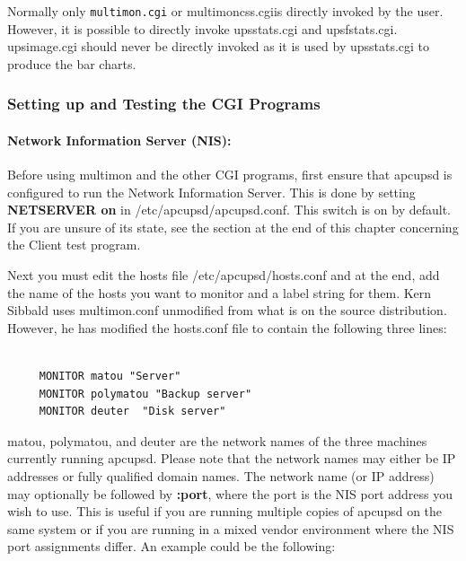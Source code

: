 {{{{{{{Normally only {\tt multimon.cgi} or multimoncss.cgiis directly invoked by the
user. However, it is possible to directly invoke upsstats.cgi and
upsfstats.cgi. upsimage.cgi should never be directly invoked as it is used by
upsstats.cgi to produce the bar charts. 

\label{Setting-up-and-Testing-the-CGI-Programs}

\subsubsection*{Setting up and Testing the CGI Programs}

\label{index-Setup-CGI-programs-122}
\label{index-Testing-CGI-programs-123}

\label{Network-Information-Server-_005bNIS_005d}

\paragraph*{Network Information Server (NIS):}

\label{index-Network-Information-Server-124}
\label{index-NIS-125}
Before using multimon and the other CGI programs, first ensure that apcupsd is
configured to run the Network Information Server. This is done by setting {\bf
NETSERVER on} in /etc/apcupsd/apcupsd.conf.  This switch is on by default.  If
you are unsure of its state, see the section at the end of this chapter
concerning the Client test program.  

Next you must edit the hosts file /etc/apcupsd/hosts.conf and at the end, add
the name of the hosts you want to monitor and a label string for them. Kern
Sibbald uses multimon.conf unmodified from what is on the source distribution.
However, he has modified the hosts.conf file to contain the following three
lines: 

\footnotesize
\begin{verbatim}
     
     MONITOR matou "Server"
     MONITOR polymatou "Backup server"
     MONITOR deuter  "Disk server"
\end{verbatim}
\normalsize

matou, polymatou, and deuter are the network names of the three machines
currently running apcupsd. Please note that the network names may either be IP
addresses or fully qualified domain names.  The network name (or IP address)
may optionally be followed by {\bf :\lt{}port\gt{}}, where the port is the NIS
port address you wish to use. This is useful if you are running multiple
copies of apcupsd on the same system or if you are running in a mixed vendor
environment where the NIS port assignments differ. An example could be the
following: 

}}}}}}}
